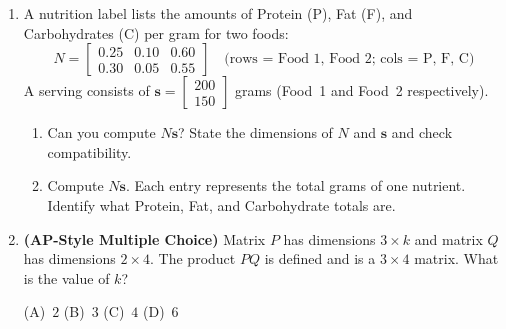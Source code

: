 \documentclass[10pt]{article}
\begin{document}
\begin{enumerate}[leftmargin=1.6em, itemsep=14pt]
\vspace{1.6in}

\item A nutrition label lists the amounts of Protein (P), Fat (F), and Carbohydrates (C)
per gram for two foods:
\[
  N = \begin{bmatrix}0.25 & 0.10 & 0.60 \\ 0.30 & 0.05 & 0.55\end{bmatrix}
  \quad \text{(rows = Food 1, Food 2; cols = P, F, C)}
\]
A serving consists of $\mathbf{s} = \begin{bmatrix}200 \\ 150\end{bmatrix}$ grams
(Food~1 and Food~2 respectively).

\begin{enumerate}[label=(\alph*), itemsep=6pt]
  \item Can you compute $N\mathbf{s}$? State the dimensions of $N$ and $\mathbf{s}$
        and check compatibility.
  \item Compute $N\mathbf{s}$. Each entry represents the total grams of one nutrient.
        Identify what Protein, Fat, and Carbohydrate totals are.
\end{enumerate}

\vspace{2.0in}

\item \textbf{(AP-Style Multiple Choice)} \quad
Matrix $P$ has dimensions $3 \times k$ and matrix $Q$ has dimensions $2 \times 4$.
The product $PQ$ is defined and is a $3 \times 4$ matrix.
What is the value of $k$?

\medskip
(A)~$2$ \qquad (B)~$3$ \qquad (C)~$4$ \qquad (D)~$6$

\end{enumerate}
\end{document}
